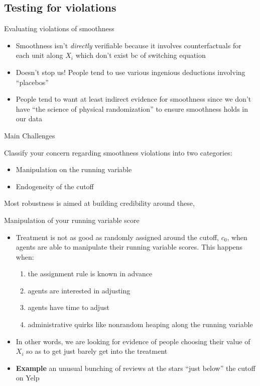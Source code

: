 \documentclass{beamer}
\begin{document}
\subsection{Testing for violations}

\begin{frame}{Evaluating violations of smoothness}

\begin{itemize}
\item Smoothness isn't \emph{directly} verifiable because it involves counterfactuals for each unit along $X_i$ which don't exist bc of switching equation
\item Doesn't stop us!  People tend to use various ingenious deductions involving ``placebos''
\item People tend to want at least indirect evidence for smoothness since we don't have ``the science of physical randomization'' to ensure smoothness holds in our data
\end{itemize}

\end{frame}


\begin{frame}{Main Challenges}

Classify your concern regarding smoothness violations into two categories:
\begin{itemize}
\item Manipulation on the running variable 
\item Endogeneity of the cutoff
\end{itemize}Most robustness is aimed at building credibility around these, 

\end{frame}




\begin{frame}{Manipulation of your running variable score}
	
	\begin{itemize}
	\item Treatment is not as good as randomly assigned around the cutoff, $c_0$, when agents are able to manipulate their running variable scores.  This happens when:
		\begin{enumerate}
		\item the assignment rule is known in advance
		\item agents are interested in adjusting
		\item agents have time to adjust
		\item administrative quirks like nonrandom heaping along the running variable
		\end{enumerate}
	\item In other words, we are looking for evidence of people choosing their value of $X_i$ so as to get just barely get into the treatment
	\item \textbf{Example} an unusual bunching of reviews at the stars ``just below'' the cutoff on Yelp
	\end{itemize}
\end{frame}
\end{document}
